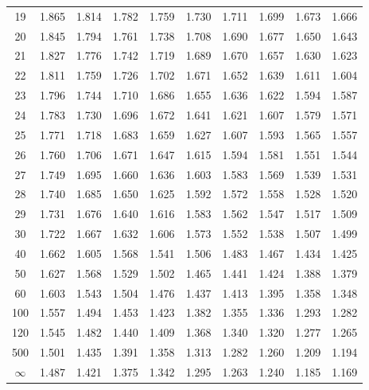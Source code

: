 \documentclass[12pt]{article}
\begin{document}
\begin{table}
\begin{center}
{\begin{tabular}{|c|c|c|c|c|c|c|c|c|c|}
	19 & 1.865 &1.814 &1.782 &1.759 &1.730 &1.711 &1.699 &1.673 &1.666\\
	20 & 1.845 &1.794 &1.761 &1.738 &1.708 &1.690 &1.677 &1.650 &1.643\\
	21 & 1.827 &1.776 &1.742 &1.719 &1.689 &1.670 &1.657 &1.630 &1.623\\
	22 & 1.811 &1.759 &1.726 &1.702 &1.671 &1.652 &1.639 &1.611 &1.604\\
	23 & 1.796 &1.744 &1.710 &1.686 &1.655 &1.636 &1.622 &1.594 &1.587\\
	24 & 1.783 &1.730 &1.696 &1.672 &1.641 &1.621 &1.607 &1.579 &1.571\\
	25 & 1.771 &1.718 &1.683 &1.659 &1.627 &1.607 &1.593 &1.565 &1.557\\
	26 & 1.760 &1.706 &1.671 &1.647 &1.615 &1.594 &1.581 &1.551 &1.544\\
	27 & 1.749 &1.695 &1.660 &1.636 &1.603 &1.583 &1.569 &1.539 &1.531\\
	28 & 1.740 &1.685 &1.650 &1.625 &1.592 &1.572 &1.558 &1.528 &1.520\\
	29 & 1.731 &1.676 &1.640 &1.616 &1.583 &1.562 &1.547 &1.517 &1.509\\
	30 & 1.722 &1.667 &1.632 &1.606 &1.573 &1.552 &1.538 &1.507 &1.499\\
	40 & 1.662 &1.605 &1.568 &1.541 &1.506 &1.483 &1.467 &1.434 &1.425\\
	50 & 1.627 &1.568 &1.529 &1.502 &1.465 &1.441 &1.424 &1.388 &1.379\\
	60 & 1.603 &1.543 &1.504 &1.476 &1.437 &1.413 &1.395 &1.358 &1.348\\
	100 & 1.557 &1.494 &1.453 &1.423 &1.382 &1.355 &1.336 &1.293 &1.282\\
	120 & 1.545 &1.482 &1.440 &1.409 &1.368 &1.340 &1.320 &1.277 &1.265\\
	500 & 1.501 &1.435 &1.391 &1.358 &1.313 &1.282 &1.260 &1.209 &1.194\\ \hline
	$\infty$ & 1.487 &1.421 &1.375 &1.342 &1.295 &1.263 &1.240 &1.185 &1.169\\
	\hline
\end{tabular}
}
\end{center}
\end{table}

\end{document}
